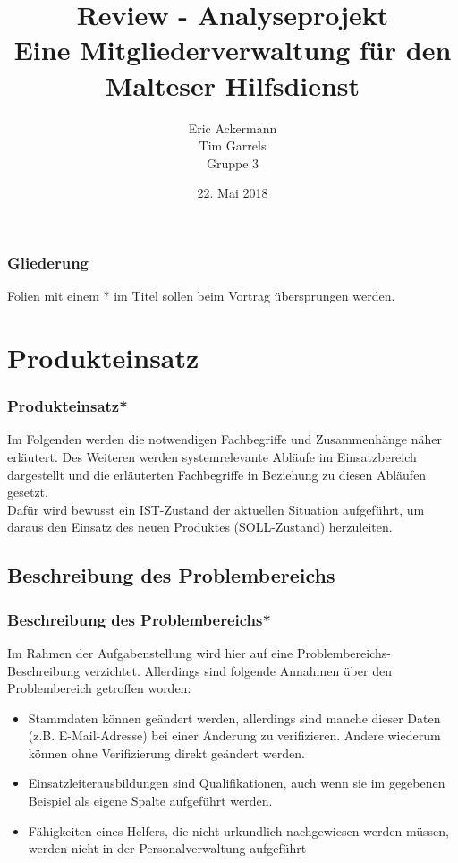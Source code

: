 \documentclass{beamer}
\begin{document}
			
	
	\title[Review - Analyseprojekt]{Review - Analyseprojekt\\ Eine Mitgliederverwaltung für den Malteser Hilfsdienst}
	\author[Eric Ackermann]{Eric Ackermann\\Tim Garrels\\ Gruppe 3}
	
	 \begin{frame}[title=Hauptgebaeude_Nacht.jpg]
	 \maketitle
	 \date{22. Mai 2018}
 	\end{frame}
	 
	\begin{frame}
		\frametitle{Gliederung}
		\tableofcontents
		Folien mit einem * im Titel sollen beim Vortrag übersprungen werden.
	\end{frame}

\section{Produkteinsatz}		
\begin{frame}
\frametitle{Produkteinsatz*}
Im Folgenden werden die notwendigen Fachbegriffe und Zusammenhänge näher erläutert. Des Weiteren werden systemrelevante Abläufe im Einsatzbereich dargestellt und die erläuterten Fachbegriffe in Beziehung zu diesen Abläufen gesetzt.\\
Dafür wird bewusst ein IST-Zustand der aktuellen Situation aufgeführt, um daraus den Einsatz des neuen Produktes (SOLL-Zustand) herzuleiten.
\end{frame}

\subsection{Beschreibung des Problembereichs}		
\begin{frame}
\frametitle{Beschreibung des Problembereichs*}
Im Rahmen der Aufgabenstellung wird hier auf eine Problembereichs-Beschreibung verzichtet. Allerdings sind folgende Annahmen über den Problembereich getroffen worden:
\begin{itemize}
\item Stammdaten können geändert werden, allerdings sind manche dieser Daten (z.B. E-Mail-Adresse) bei einer Änderung zu verifizieren. Andere wiederum können ohne Verifizierung direkt geändert werden.
\item Einsatzleiterausbildungen sind Qualifikationen, auch wenn sie im gegebenen Beispiel als eigene Spalte aufgeführt werden.
\item Fähigkeiten eines Helfers, die nicht urkundlich nachgewiesen werden müssen, werden nicht in der Personalverwaltung aufgeführt
\end{itemize}
\end{frame}
\end{document}
